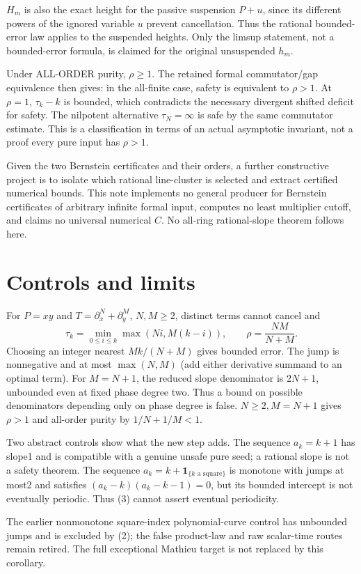 \documentclass{article}
\begin{document}
$H_m$ is also the exact height for the passive suspension $P+u$, since its different powers of the ignored variable $u$ prevent cancellation. Thus the rational bounded-error law applies to the suspended heights. Only the limsup statement, not a bounded-error formula, is claimed for the original unsuspended $h_m$.

Under ALL-ORDER purity, $\rho\ge1$. The retained formal commutator/gap equivalence then gives: in the all-finite case, safety is equivalent to $\rho>1$. At $\rho=1$, $\tau_k-k$ is bounded, which contradicts the necessary divergent shifted deficit for safety. The nilpotent alternative $\tau_N=\infty$ is safe by the same commutator estimate. This is a classification in terms of an actual asymptotic invariant, not a proof every pure input has $\rho>1$.

Given the two Bernstein certificates and their orders, a further constructive project is to isolate which rational line-cluster is selected and extract certified numerical bounds. This note implements no general producer for Bernstein certificates of arbitrary infinite formal input, computes no least multiplier cutoff, and claims no universal numerical $C$. No all-ring rational-slope theorem follows here.

\section{Controls and limits}
For $P=xy$ and $T=\partial_x^N+\partial_y^M$, $N,M\ge2$, distinct terms cannot cancel and
\[
 \tau_k=\min_{0\le i\le k}\max(Ni,M(k-i)),\qquad
 \rho=\frac{NM}{N+M}.
\]
Choosing an integer nearest $Mk/(N+M)$ gives bounded error. The jump is nonnegative and at most $\max(N,M)$ (add either derivative summand to an optimal term). For $M=N+1$, the reduced slope denominator is $2N+1$, unbounded even at fixed phase degree two. Thus a bound on possible denominators depending only on phase degree is false. $N\ge2,M=N+1$ gives $\rho>1$ and all-order purity by $1/N+1/M<1$.

Two abstract controls show what the new step adds. The sequence $a_k=k+1$ has slope1 and is compatible with a genuine unsafe pure seed; a rational slope is not a safety theorem. The sequence $a_k=k+\mathbf1_{\{k\text{ a square}\}}$ is monotone with jumps at most2 and satisfies $(a_k-k)(a_k-k-1)=0$, but its bounded intercept is not eventually periodic. Thus (3) cannot assert eventual periodicity.

The earlier nonmonotone square-index polynomial-curve control has unbounded jumps and is excluded by (2); the false product-law and raw scalar-time routes remain retired. The full exceptional Mathieu target is not replaced by this corollary.
\end{document}
